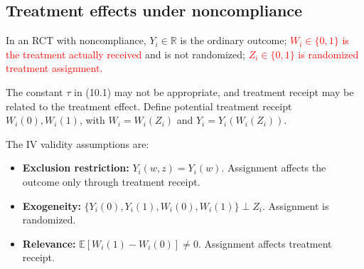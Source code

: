 \documentclass[11pt,a4paper]{article}
\newcommand{\inkred}[1]{\textcolor{red}{#1}}
\begin{document}
\subsection{Treatment effects under noncompliance}
In an RCT with noncompliance, $Y_i\in\mathbb R$ is the ordinary outcome; \inkred{$W_i\in\{0,1\}$ is the treatment actually received} and is not randomized; \inkred{$Z_i\in\{0,1\}$ is randomized treatment assignment.}

The constant $\tau$ in (10.1) may not be appropriate, and treatment receipt may be related to the treatment effect. Define potential treatment receipt $W_i(0),W_i(1)$, with $W_i=W_i(Z_i)$ and $Y_i=Y_i(W_i(Z_i))$.

The IV validity assumptions are:
\begin{itemize}
 \item \textbf{Exclusion restriction:} $Y_i(w,z)=Y_i(w)$. Assignment affects the outcome only through treatment receipt.
 \item \textbf{Exogeneity:} $\{Y_i(0),Y_i(1),W_i(0),W_i(1)\}\perp Z_i$. Assignment is randomized.
 \item \textbf{Relevance:} $\mathbb E[W_i(1)-W_i(0)]\ne0$. Assignment affects treatment receipt.
\end{itemize}
\end{document}
